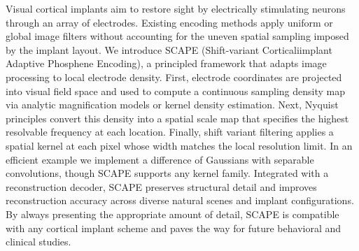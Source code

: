 Visual cortical implants aim to restore sight by electrically stimulating neurons through an array of electrodes. Existing encoding methods apply uniform or global image filters without accounting for the uneven spatial sampling imposed by the implant layout. We introduce SCAPE (Shift-variant Corticaliimplant Adaptive Phosphene Encoding), a principled framework that adapts image processing to local electrode density. First, electrode coordinates are projected into visual field space and used to compute a continuous sampling density map via analytic magnification models or kernel density estimation. Next, Nyquist principles convert this density into a spatial scale map that specifies the highest resolvable frequency at each location. Finally, shift variant filtering applies a spatial kernel at each pixel whose width matches the local resolution limit. In an efficient example we implement a difference of Gaussians with separable convolutions, though SCAPE supports any kernel family. Integrated with a reconstruction decoder, SCAPE preserves structural detail and improves reconstruction accuracy across diverse natural scenes and implant configurations. By always presenting the appropriate amount of detail, SCAPE is compatible with any cortical implant scheme and paves the way for future behavioral and clinical studies.
